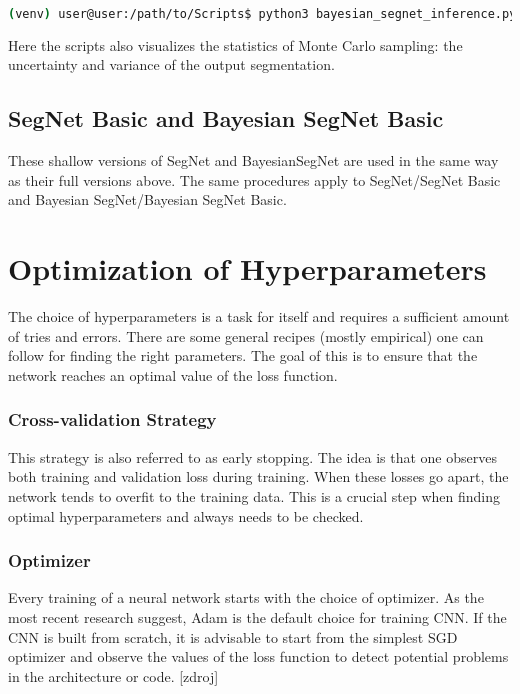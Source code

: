 \begin{lstlisting}[language=bash]
(venv) user@user:/path/to/Scripts$ python3 bayesian_segnet_inference.py /path/to/inference.prototxt /path/to/final_weights.caffemodel /path/to/videofile.avi 
\end{lstlisting}

Here the scripts also visualizes the statistics of Monte Carlo sampling: the uncertainty and variance of the output segmentation.

\subsection{SegNet Basic and Bayesian SegNet Basic}

These shallow versions of SegNet and BayesianSegNet are used in the same way as their full versions above. The same procedures apply to SegNet/SegNet Basic and Bayesian SegNet/Bayesian SegNet Basic.

\section{Optimization of Hyperparameters}

The choice of hyperparameters is a task for itself and requires a sufficient amount of tries and errors. There are some general recipes (mostly empirical) one can follow for finding the right parameters. The goal of this is to ensure that the network reaches an optimal value of the loss function.  

\subsubsection{Cross-validation Strategy}

This strategy is also referred to as early stopping. The idea is that one observes both training and validation loss during training. When these losses go apart, the network tends to overfit to the training data. This is a crucial step when finding optimal hyperparameters and always needs to be checked.

\subsubsection{Optimizer}

Every training of a neural network starts with the choice of optimizer. As the most recent research suggest, Adam is the default choice for training CNN. If the CNN is built from scratch, it is advisable to start from the simplest SGD optimizer and observe the values of the loss function to detect potential problems in the architecture or code. [zdroj] 


